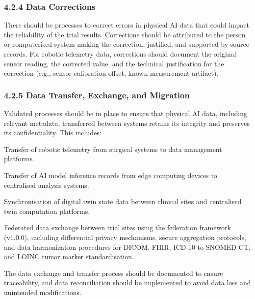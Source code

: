 \documentclass[11pt]{article}
\begin{document}
\subsubsection{4.2.4 Data Corrections}

There should be processes to correct errors in physical AI data that could impact the reliability of the trial results. Corrections should be attributed to the person or computerised system making the correction, justified, and supported by source records. For robotic telemetry data, corrections should document the original sensor reading, the corrected value, and the technical justification for the correction (e.g., sensor calibration offset, known measurement artifact).

\subsubsection{4.2.5 Data Transfer, Exchange, and Migration}

Validated processes should be in place to ensure that physical AI data, including relevant metadata, transferred between systems retains its integrity and preserves its confidentiality. This includes:

\begin{description}[leftmargin=2.5cm,style=sameline]

\item[(a)] Transfer of robotic telemetry from surgical systems to data management platforms.

\item[(b)] Transfer of AI model inference records from edge computing devices to centralised analysis systems.

\item[(c)] Synchronisation of digital twin state data between clinical sites and centralised twin computation platforms.

\item[(d)] Federated data exchange between trial sites using the federation framework (v1.0.0), including differential privacy mechanisms, secure aggregation protocols, and data harmonization procedures for DICOM, FHIR, ICD-10 to SNOMED CT, and LOINC tumor marker standardisation.

\end{description}

The data exchange and transfer process should be documented to ensure traceability, and data reconciliation should be implemented to avoid data loss and unintended modifications.
\end{document}

